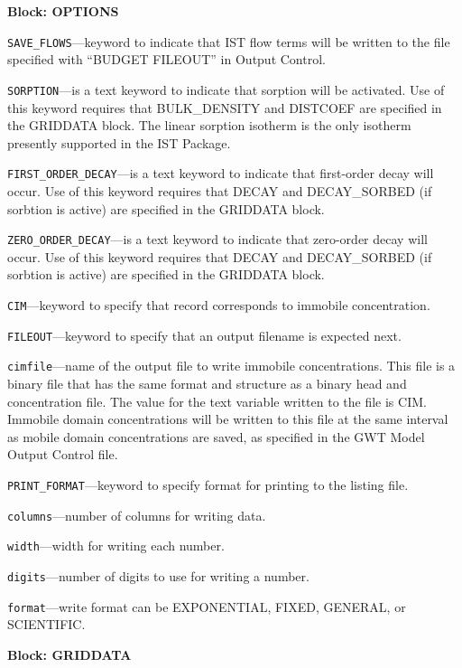 
\item \textbf{Block: OPTIONS}

\begin{description}
\item \texttt{SAVE\_FLOWS}---keyword to indicate that IST flow terms will be written to the file specified with ``BUDGET FILEOUT'' in Output Control.

\item \texttt{SORPTION}---is a text keyword to indicate that sorption will be activated.  Use of this keyword requires that BULK\_DENSITY and DISTCOEF are specified in the GRIDDATA block.  The linear sorption isotherm is the only isotherm presently supported in the IST Package.

\item \texttt{FIRST\_ORDER\_DECAY}---is a text keyword to indicate that first-order decay will occur.  Use of this keyword requires that DECAY and DECAY\_SORBED (if sorbtion is active) are specified in the GRIDDATA block.

\item \texttt{ZERO\_ORDER\_DECAY}---is a text keyword to indicate that zero-order decay will occur.  Use of this keyword requires that DECAY and DECAY\_SORBED (if sorbtion is active) are specified in the GRIDDATA block.

\item \texttt{CIM}---keyword to specify that record corresponds to immobile concentration.

\item \texttt{FILEOUT}---keyword to specify that an output filename is expected next.

\item \texttt{cimfile}---name of the output file to write immobile concentrations.  This file is a binary file that has the same format and structure as a binary head and concentration file.  The value for the text variable written to the file is CIM.  Immobile domain concentrations will be written to this file at the same interval as mobile domain concentrations are saved, as specified in the GWT Model Output Control file.

\item \texttt{PRINT\_FORMAT}---keyword to specify format for printing to the listing file.

\item \texttt{columns}---number of columns for writing data.

\item \texttt{width}---width for writing each number.

\item \texttt{digits}---number of digits to use for writing a number.

\item \texttt{format}---write format can be EXPONENTIAL, FIXED, GENERAL, or SCIENTIFIC.

\end{description}
\item \textbf{Block: GRIDDATA}


